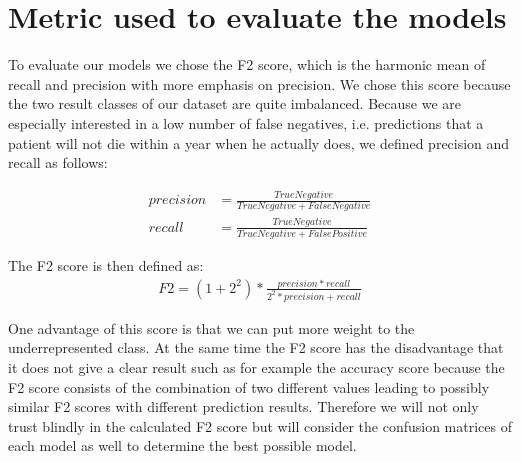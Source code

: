 \section{Metric used to evaluate the models}
To evaluate our models we chose the F2 score, which is the harmonic mean of recall and precision with more emphasis on precision. We chose this score because the two result classes of our dataset are quite imbalanced. Because we are especially interested in a low number of false negatives, i.e. predictions that a patient will not die within a year when he actually does, we defined precision and recall as follows:

\begin{align*}
precision &= \frac{True Negative}{True Negative + False Negative} \\
recall &= \frac{True Negative}{True Negative + False Positive}
\end{align*}

The F2 score is then defined as:
\begin{align*}
F2 = (1 + 2^2) * \frac{precision * recall}{2^2 * precision + recall}
\end{align*}

One advantage of this score is that we can put more weight to the underrepresented class. At the same time the F2 score has the disadvantage that it does not give a clear result such as for example the accuracy score because the F2 score consists of the combination of two different values leading to possibly similar F2 scores with different prediction results. Therefore we will not only trust blindly in the calculated F2 score but will consider the confusion matrices of each model as well to determine the best possible model.